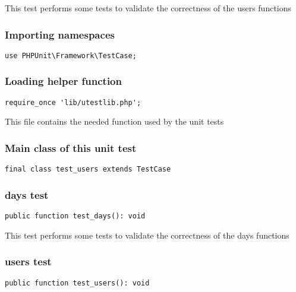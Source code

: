 \documentclass[a4paper]{article}
\begin{document}
This test performs some tests to validate the correctness
of the users functions

\hypertarget{toc413}{}
\subsubsection{Importing namespaces}

\begin{lstlisting}
use PHPUnit\Framework\TestCase;
\end{lstlisting}

\hypertarget{toc414}{}
\subsubsection{Loading helper function}

\begin{lstlisting}
require_once 'lib/utestlib.php';
\end{lstlisting}

This file contains the needed function used by the unit tests

\hypertarget{toc415}{}
\subsubsection{Main class of this unit test}

\begin{lstlisting}
final class test_users extends TestCase
\end{lstlisting}

\hypertarget{toc416}{}
\subsubsection{days test}

\begin{lstlisting}
public function test_days(): void
\end{lstlisting}

This test performs some tests to validate the correctness
of the days functions

\hypertarget{toc417}{}
\subsubsection{users test}

\begin{lstlisting}
public function test_users(): void
\end{lstlisting}
\end{document}
